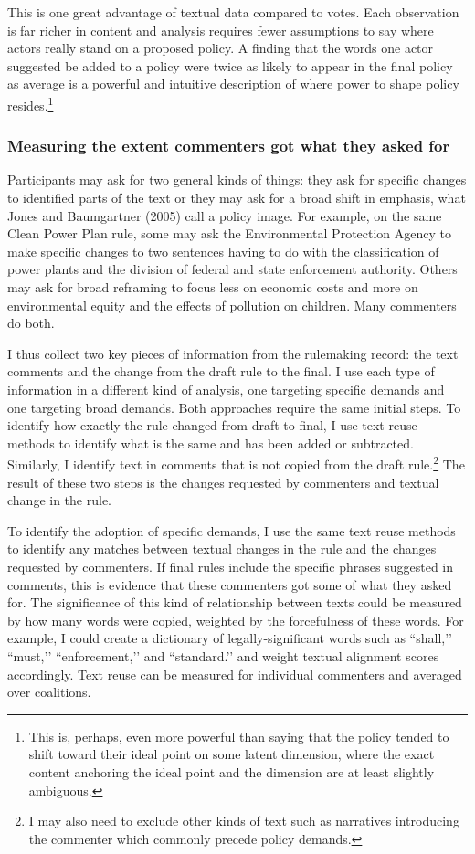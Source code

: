 This is one great advantage of textual data compared to votes. Each observation is far richer in content and analysis requires fewer assumptions to say where actors really stand on a proposed policy. A finding that the words one actor suggested be added to a policy were twice as likely to appear in the final policy as average is a powerful and intuitive description of where power to shape policy resides.\footnote{This is, perhaps, even more powerful than saying that the policy tended to shift toward their ideal point on some latent dimension, where the exact content anchoring the ideal point and the dimension are at least slightly ambiguous.}

\subsubsection{Measuring the extent commenters got what they asked for}

Participants may ask for two general kinds of things: they ask for specific changes to identified parts of the text or they may ask for a broad shift in emphasis, what Jones and Baumgartner (2005) call a policy image. For example, on the same Clean Power Plan rule, some may ask the Environmental Protection Agency to make specific changes to two sentences having to do with the classification of power plants and the division of federal and state enforcement authority. Others may ask for broad reframing to focus less on economic costs and more on environmental equity and the effects of pollution on children. Many commenters do both. 

I thus collect two key pieces of information from the rulemaking record: the text comments and the change from the draft rule to the final. I use each type of information in a different kind of analysis, one targeting specific demands and one targeting broad demands. Both approaches require the same initial steps. To identify how exactly the rule changed from draft to final, I use text reuse methods to identify what is the same and has been added or subtracted. Similarly, I identify text in comments that is not copied from the draft rule.\footnote{I may also need to exclude other kinds of text such as narratives introducing the commenter which commonly precede policy demands.} The result of these two steps is the changes requested by commenters and textual change in the rule. 

To identify the adoption of specific demands, I use the same text reuse methods to identify any matches between textual changes in the rule and the changes requested by commenters. If final rules include the specific phrases suggested in comments, this is evidence that these commenters got some of what they asked for. The significance of this kind of relationship between texts could be measured by how many words were copied, weighted by the forcefulness of these words. For example, I could create a dictionary of legally-significant words such as ``shall,’’ ``must,’’ ``enforcement,’’ and ``standard.’’ and weight textual alignment scores accordingly. Text reuse can be measured for individual commenters and averaged over coalitions. 

